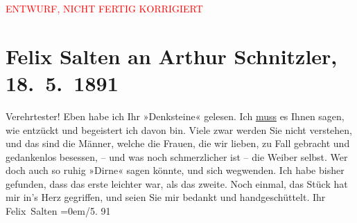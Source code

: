
\begin{center}
            \textcolor{red}{ENTWURF, NICHT FERTIG KORRIGIERT}
                      \end{center}
            
         \renewcommand{\erwaehnteOrte}{Orte: Wien}
         \renewcommand{\erwaehnteWerke}{Werke: Denksteine}
               \section[Felix Salten an Arthur Schnitzler, 18. 5. 1891]{ Felix Salten an Arthur Schnitzler, 18. 5. 1891}\nopagebreak{}\rehead{ }\begin{ledgroupsized}[t]{13cm}\normalsize\beginnumbering \toendnotes[C]{\smallbreak\pagebreak[2]} 
\toendnotes[C]{\smallbreak}\pstart
           \noindent{}{\pb}Verehrtester! Eben habe ich Ihr »Denksteine« gelesen. Ich \uline{muss} es Ihnen
               sagen, wie entzückt und begeistert ich davon bin. Viele zwar werden Sie nicht
               verstehen, und das sind die Männer, welche die Frauen, die wir lieben, zu Fall
               gebracht und gedankenlos besessen, – und was noch schmerzlicher ist – die Weiber
               selbst.\pend
           \pstart
           Wer doch auch so ruhig »Dirne« sagen könnte, und sich wegwenden. \pend
           \pstart
           Ich habe bisher gefunden, dass das erste {\pb}leichter war, als das zweite. \pend
           \pstart
           Noch einmal, das Stück hat mir
               in’s Herz gegriffen, und seien Sie mir bedankt und handgeschüttelt. \pend
           \pstart
           Ihr{\\[\baselineskip]}\spacefill\mbox{Felix Salten}\pend
           \leftskip=0em{}/5.{ }91\pend
           
         
         \endnumbering{}\end{ledgroupsized}\begin{anhang}\end{anhang}\newcommand{\dateiname}{L03101}\newcommand{\titel}{Felix Salten an Arthur Schnitzler, 18. 5. 1891}\newcommand{\editorInnen}{Martin Anton Müller und Laura Untner}
      